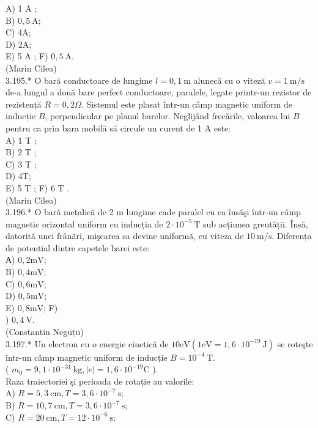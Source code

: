 \documentclass[10pt]{article}
\begin{document}
A) 1 A ;\\
B) $0,5 \mathrm{~A}$;\\
C) 4A;\\
D) 2A;\\
E) 5 A ; F) $0,5 \mathrm{~A}$.\\
(Marin Cilea)\\
3.195.* O bară conductoare de lungime $l=0,1 \mathrm{~m}$ alunecă cu o viteză $v=1 \mathrm{~m} / \mathrm{s}$ de-a lungul a două bare perfect conductoare, paralele, legate printr-un rezistor de rezistență $R=0,2 \Omega$. Sistemul este plasat într-un câmp magnetic uniform de inducție $B$, perpendicular pe planul barelor. Neglijând frecările, valoarea lui $B$ pentru ca prin bara mobilă să circule un curent de 1 A este:\\
A) 1 T ;\\
B) 2 T ;\\
C) 3 T ;\\
D) 4T;\\
E) 5 T ; F) 6 T .\\
(Marin Cilea)\\
3.196.* O bară metalică de 2 m lungime cade paralel cu ea însăşi într-un câmp magnetic orizontal uniform cu inducția de $2 \cdot 10^{-5} \mathrm{~T}$ sub acțiunea greutății. Însă, datorită unei frânări, mişcarea sa devine uniformă, cu viteza de $10 \mathrm{~m} / \mathrm{s}$. Diferența de potential dintre capetele barei este:\\
А) $0,2 \mathrm{mV}$;\\
B) $0,4 \mathrm{mV}$;\\
C) $0,6 \mathrm{mV}$;\\
D) $0,5 \mathrm{mV}$;\\
E) $0,8 \mathrm{mV}$; F)\\
) $0,4 \mathrm{~V}$.\\
(Constantin Neguțu)\\
3.197.* Un electron cu o energie cinetică de $10 \mathrm{eV}\left(1 \mathrm{eV}=1,6 \cdot 10^{-19} \mathrm{~J}\right)$ se roteşte într-un câmp magnetic uniform de inducție $B=10^{-4} \mathrm{~T}$.\\
( $m_{0}=9,1 \cdot 10^{-31} \mathrm{~kg},|e|=1,6 \cdot 10^{-19} \mathrm{C}$ ).\\
Raza traiectoriei şi perioada de rotație au valorile:\\
A) $R=5,3 \mathrm{~cm}, T=3,6 \cdot 10^{-7} \mathrm{~s}$;\\
B) $R=10,7 \mathrm{~cm}, T=3,6 \cdot 10^{-7} \mathrm{~s}$;\\
C) $R=20 \mathrm{~cm}, T=12 \cdot 10^{-6} \mathrm{~s}$;\\
\end{document}
